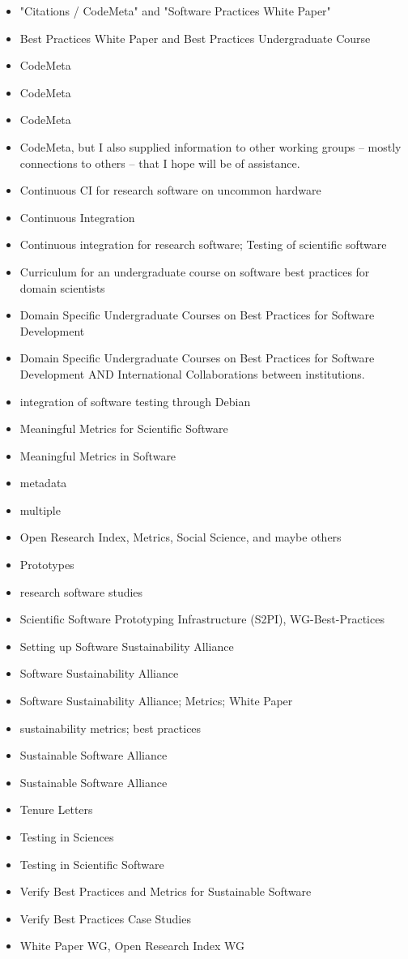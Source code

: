 \begin{itemize}
\item "Citations / CodeMeta"  and  "Software Practices White Paper"
\item Best Practices White Paper and Best Practices Undergraduate Course
\item CodeMeta
\item CodeMeta
\item CodeMeta
\item CodeMeta, but I also supplied information to other working groups -- mostly connections to others -- that I hope will be of assistance.
\item Continuous CI for research software on uncommon hardware
\item Continuous Integration
\item Continuous integration for research software; Testing of scientific software
\item Curriculum for an undergraduate course on software best practices for domain scientists
\item Domain Specific Undergraduate Courses on Best Practices for Software Development
\item Domain Specific Undergraduate Courses on Best Practices for Software Development AND International Collaborations between institutions.
\item integration of software testing through Debian 
\item Meaningful Metrics for Scientific Software
\item Meaningful Metrics in Software
\item metadata
\item multiple
\item Open Research Index, Metrics, Social Science, and maybe others
\item Prototypes
\item research software studies
\item Scientific Software Prototyping Infrastructure (S2PI), WG-Best-Practices
\item Setting up Software Sustainability Alliance
\item Software Sustainability Alliance
\item Software Sustainability Alliance; Metrics; White Paper
\item sustainability metrics; best practices
\item Sustainable Software Alliance
\item Sustainable Software Alliance
\item Tenure Letters
\item Testing in Sciences
\item Testing in Scientific Software
\item Verify Best Practices and Metrics for Sustainable Software
\item Verify Best Practices Case Studies
\item White Paper WG, Open Research Index WG
\end{itemize}

